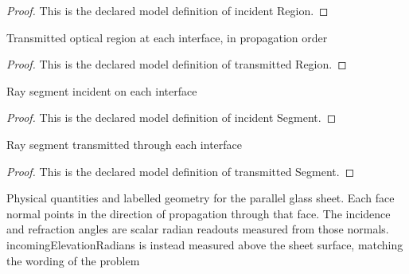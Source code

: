 \begin{proof}
  This is the declared model definition of incident Region.
\end{proof}
\begin{definition}
  \label{def:physics:phyx-mini-0049:phyxminiproblems-problemphyxmini0049-transmittedregion}
  Transmitted optical region at each interface, in propagation order
\end{definition}
\begin{proof}
  This is the declared model definition of transmitted Region.
\end{proof}
\begin{definition}
  \label{def:physics:phyx-mini-0049:phyxminiproblems-problemphyxmini0049-incidentsegment}
  Ray segment incident on each interface
\end{definition}
\begin{proof}
  This is the declared model definition of incident Segment.
\end{proof}
\begin{definition}
  \label{def:physics:phyx-mini-0049:phyxminiproblems-problemphyxmini0049-transmittedsegment}
  Ray segment transmitted through each interface
\end{definition}
\begin{proof}
  This is the declared model definition of transmitted Segment.
\end{proof}
\begin{definition}
  \label{def:physics:phyx-mini-0049:phyxminiproblems-problemphyxmini0049-parallelglasssheetdiagram}
  Physical quantities and labelled geometry for the parallel glass sheet. Each face normal points in the direction of propagation through that face. The incidence and refraction angles are scalar radian readouts measured from those normals. incomingElevationRadians is instead measured above the sheet surface, matching the wording of the problem
\end{definition}
